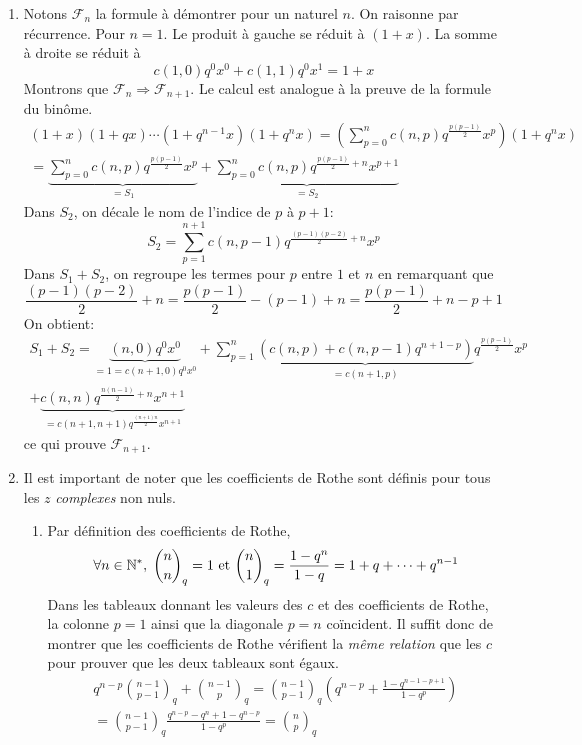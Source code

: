 \begin{enumerate}
  \item Notons $\mathcal{F}_n$ la formule à démontrer pour un naturel $n$. On raisonne par récurrence.\newline
Pour $n=1$. Le produit à gauche se réduit à $(1+x)$. La somme à droite se réduit à
\begin{displaymath}
  c(1,0)q^{0}x^0 + c(1,1)q^{0}x^{1} = 1 +x
\end{displaymath}
Montrons que $\mathcal{F}_n \Rightarrow \mathcal{F}_{n+1}$. Le calcul est analogue à la preuve de la formule du binôme.
\begin{multline*}
(1+x)(1+qx)\cdots(1+q^{n-1}x)(1+q^nx)
= \left(\sum _{p=0}^n c(n,p)q^{\frac{p(p-1)}{2}}x^p\right)(1+q^nx) \\
= \underset{= S_1}{\underbrace{\sum _{p=0}^n c(n,p)q^{\frac{p(p-1)}{2}}x^p}}
+ \underset{=S_2}{\underbrace{\sum _{p=0}^n c(n,p)q^{\frac{p(p-1)}{2}+n}x^{p+1}}}
\end{multline*}
Dans $S_2$, on décale le nom de l'indice de $p$ à $p+1$:
\begin{displaymath}
S_2 = \sum _{p=1}^{n+1} c(n,p-1)q^{\frac{(p-1)(p-2)}{2}+n}x^{p}
\end{displaymath}
Dans $S_1 + S_2$, on regroupe les termes pour $p$ entre $1$ et $n$ en remarquant que 
\begin{displaymath}
  \frac{(p-1)(p-2)}{2} +n = \frac{p(p-1)}{2} -(p-1) +n  =  \frac{p(p-1)}{2} + n-p+1
\end{displaymath}
On obtient:
\begin{multline*}
S_1 + S_2 = \underset{=1=c(n+1,0)q^0x^0}{\underbrace{(n,0)q^0x^0}} 
+\sum_{p=1}^{n}\underset{=c(n+1,p)}{\underbrace{\left(c(n,p)+c(n,p-1)q^{n+1-p}\right)}}q^{\frac{p(p-1)}{2}}x^{p} \\
+\underset{=c(n+1,n+1)q^{\frac{(n+1)n}{2}}x^{n+1}}{\underbrace{c(n,n)q^{\frac{n(n-1)}{2}+n}x^{n+1}}}
\end{multline*}
ce qui prouve $\mathcal{F}_{n+1}$.

  \item Il est important de noter que les coefficients de Rothe sont définis pour tous les $z$ \emph{complexes} non nuls.
\begin{enumerate}
  \item Par définition des coefficients de Rothe,
\begin{displaymath}
  \forall n \in \mathbb{N}^*,\; \binom{n}{n}_q = 1 \text{ et } \binom{n}{1}_q = \frac{1-q^n}{1-q} = 1+ q+\cdots +q^{n-1}
\end{displaymath}
Dans les tableaux donnant les valeurs des $c$ et des coefficients de Rothe, la colonne $p=1$ ainsi que la diagonale $p=n$ coïncident. Il suffit donc de montrer que les coefficients de Rothe vérifient la \emph{même relation} que les $c$ pour prouver que les deux tableaux sont égaux.
\begin{multline*}
q^{n-p}{\binom{n-1}{p-1}}_q + {\binom{n-1}{p}}_q
= {\binom{n-1}{p-1}}_q\left(q^{n-p} + \frac{1-q^{n-1-p+1}}{1-q^{p}} \right) \\
= {\binom{n-1}{p-1}}_q\frac{q^{n-p}-q^n +1 -q^{n-p}}{1-q^{p}} 
= {\binom{n}{p}}_q
\end{multline*}


\end{enumerate}
\end{enumerate}
